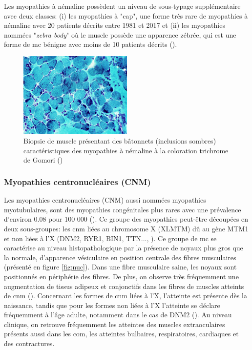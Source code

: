 Les myopathies à némaline possèdent un niveau de sous-typage supplémentaire avec deux classes: (i) les myopathies à "cap", une forme très rare de myopathies à némaline avec 20 patients décrits entre 1981 et 2017 et (ii) les myopathies nommées "\textit{zebra body}" où le muscle possède une apparence zébrée, qui est une forme de \gls{mc} bénigne avec moins de 10 patients décrits (\cite{cassandrini_congenital_2017}).
\begin{figure}[!ht]
 \centering
 \includegraphics[width=0.5\textwidth]{figures/rods.jpg}
 \caption[Biopsie de muscle de myopathies à némaline]{Biopsie de muscle présentant des bâtonnets (inclusions sombres) caractéristiques des myopathies à némaline à la coloration trichrome de Gomori (\cite{alan_pestronk_neuromuscular_2022})}
 \label{fig:rods}
\end{figure}



\subsubsection{Myopathies centronucléaires (CNM)}
Les myopathies centronucléaires  (CNM) aussi nommées myopathies myotubulaires, sont des myopathies congénitales plus rares avec une prévalence d'environ 0.08 pour 100 000 (\cite{huang_systematic_2021}). Ce groupe des myopathies peut-être découpées en deux sous-groupes: les \gls{cnm} liées au chromosome X (XLMTM) dû au gène MTM1 et non liées à l'X (DNM2, RYR1, BIN1, TTN..., \cite{north_approach_2014}). Ce groupe de \gls{mc} se caractérise au niveau histopathologique par la présence de noyaux plus gros que la normale, d'apparence vésiculaire en position centrale des fibres musculaires (présenté en figure \ref{fig:nuc}). Dans une fibre musculaire saine, les noyaux sont positionnés en périphérie des fibres. De plus, on observe très fréquemment une augmentation de tissus adipeux et conjonctifs dans les fibres de muscles atteints de \gls{cnm} (\cite{jungbluth_congenital_2018}). Concernant les formes de \gls{cnm} liées à l'X, l'atteinte est présente dès la naissance, tandis que pour les formes non liées à l'X l'atteinte se déclare fréquemment à l'âge adulte, notamment dans le cas de DNM2 (\cite{jungbluth_congenital_2018}). Au niveau clinique, on retrouve fréquemment les atteintes des muscles extraoculaires présents aussi dans les \gls{com}, les atteintes bulbaires, respiratoires, cardiaques et des contractures. 

